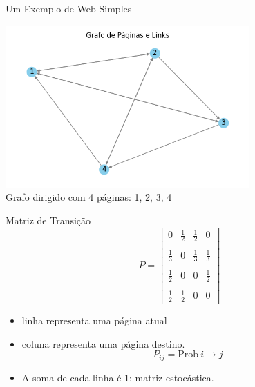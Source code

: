 \documentclass{beamer}
\begin{document}

\begin{frame}{Um Exemplo de Web Simples}
\begin{center}
\includegraphics[width=0.7\textwidth]{web_grafo.png} \\
Grafo dirigido com 4 páginas: 1, 2, 3, 4
\end{center}
\end{frame}


\begin{frame}{Matriz de Transição}
  \[
    P = \begin{bmatrix}
      0 & \frac{1}{2} & \frac{1}{2} & 0 \\\\
      \frac{1}{3} & 0 & \frac{1}{3} & \frac{1}{3} \\\\
      \frac{1}{2} & 0 & 0 & \frac{1}{2} \\\\
      \frac{1}{2} & \frac{1}{2} & 0 & 0
    \end{bmatrix}
  \]
  \begin{itemize}
  \item  linha representa uma página atual
  \item coluna representa uma página destino.
      $$P_{ij} = \mathrm{Prob} ~i\to j$$%
  \item A soma de cada linha é 1: matriz estocástica.
  \end{itemize}
  
  
\end{frame}

\end{document}
